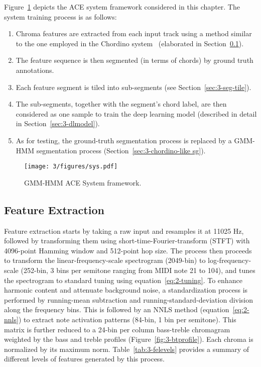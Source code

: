 Figure~\ref{fig:3-sysover} depicts the ACE system framework considered in this chapter. The system training process is as follows:
\begin{enumerate}
\item Chroma features are extracted from each input track using a method similar to the one employed in the Chordino system~\cite{mauch2010automatic,cannam2010sonic} (elaborated in Section~\ref{sec:3-chordino-like fe}).
\item The feature sequence is then segmented (in terms of chords) by ground truth annotations.
\item Each feature segment is tiled into sub-segments (see Section~\ref{sec:3-seg-tile}).
\item The sub-segments, together with the segment's chord label, are then considered as one sample to train the deep learning model (described in detail in Section~\ref{sec:3-dlmodel}).
\item As for testing, the ground-truth segmentation process is replaced by a GMM-HMM segmentation process (Section~\ref{sec:3-chordino-like sg}).
\end{enumerate}


\begin{figure}
\centering
\texttt{[image: 3/figures/sys.pdf]}
\caption{GMM-HMM ACE System framework.}
\label{fig:3-sysover}
\end{figure}

\subsection{Feature Extraction} \label{sec:3-chordino-like fe}
Feature extraction starts by taking a raw input and resamples it at 11025 Hz, followed by transforming them using short-time-Fourier-transform (STFT) with 4096-point Hamming window and 512-point hop size. The process then proceeds to transform the linear-frequency-scale spectrogram (2049-bin) to log-frequency-scale (252-bin, 3 bins per semitone ranging from MIDI note 21 to 104), and tunes the spectrogram to standard tuning using equation~\ref{eq:2-tuning}. To enhance harmonic content and attenuate background noise, a standardization process is performed by running-mean subtraction and running-standard-deviation division along the frequency bins. This is followed by an NNLS method \cite{mauch2010approximate} (equation~\ref{eq:2-nnls}) to extract note activation patterns (84-bin, 1 bin per semitone). This matrix is further reduced to a 24-bin per column bass-treble chromagram weighted by the bass and treble profiles (Figure~\ref{fig:3-btprofile}). Each chroma is normalized by its maximum norm. Table~\ref{tab:3-felevels} provides a summary of different levels of features generated by this process.


